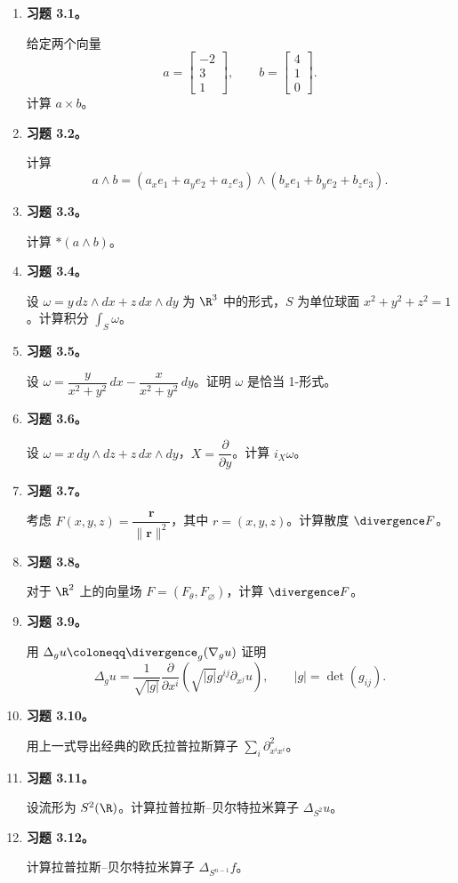 \begin{enumerate}
\item \textbf{习题 3.1。}

给定两个向量
\[
  a=\begin{bmatrix}-2\\3\\1\end{bmatrix},\qquad
  b=\begin{bmatrix}4\\1\\0\end{bmatrix}.
\]
计算 $a\times b$。
\item \textbf{习题 3.2。}

计算
\[
  a\wedge b=(a_xe_1+a_ye_2+a_ze_3)\wedge(b_xe_1+b_ye_2+b_ze_3).
\]
\item \textbf{习题 3.3。}

计算 $*(a\wedge b)$。
\item \textbf{习题 3.4。}

设 $\omega=y\,dz\wedge dx+z\,dx\wedge dy$ 为 $\R^3$ 中的形式，$S$ 为单位球面 $x^2+y^2+z^2=1$。计算积分 $\displaystyle\int_S\omega$。
\item \textbf{习题 3.5。}

设 $\omega=\dfrac{y}{x^2+y^2}\,dx-\dfrac{x}{x^2+y^2}\,dy$。证明 $\omega$ 是恰当 1-形式。%
\item \textbf{习题 3.6。}

设 $\omega=x\,dy\wedge dz+z\,dx\wedge dy$，$X=\dfrac{\partial}{\partial y}$。计算 $i_X\omega$。
\item \textbf{习题 3.7。}

考虑 $F(x,y,z)=\dfrac{\symbf{r}}{\lVert\symbf{r}\rVert^2}$，其中 $r=(x,y,z)$。计算散度 $\divergence F$。
\item \textbf{习题 3.8。}

对于 $\R^2$ 上的向量场 $F=(F_\theta,F_\varnothing)$，计算 $\divergence F$。
\item \textbf{习题 3.9。}

用 $\Delta_g u\coloneqq\divergence_g(\nabla_g u)$ 证明
\[
  \Delta_g u=\frac{1}{\sqrt{|g|}}\frac{\partial}{\partial x^i}
  \left(\sqrt{|g|}g^{ij}\partial_{x^j}u\right),\qquad |g|=\det(g_{ij}).
\]
\item \textbf{习题 3.10。}

用上一式导出经典的欧氏拉普拉斯算子 $\displaystyle\sum_i\partial^2_{x^ix^i}$。
\item \textbf{习题 3.11。}

设流形为 $S^2(\R)$。计算拉普拉斯–贝尔特拉米算子 $\Delta_{S^2}u$。
\item \textbf{习题 3.12。}

计算拉普拉斯–贝尔特拉米算子 $\Delta_{S^{n-1}}f$。
\end{enumerate}

